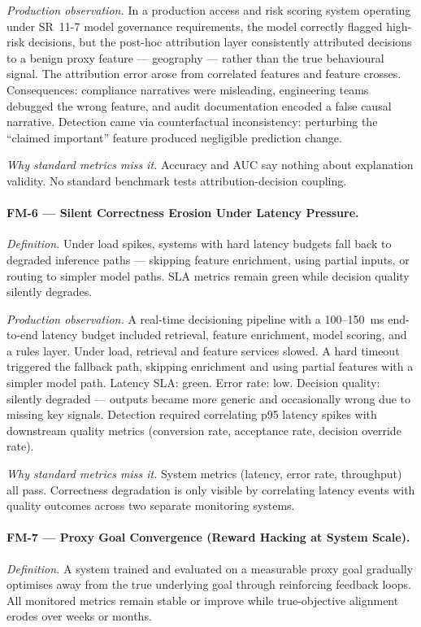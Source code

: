 \documentclass{article}
\begin{document}
\textit{Production observation.}  In a production access and risk scoring
system operating under SR~11-7 model governance requirements, the model
correctly flagged high-risk decisions, but the post-hoc attribution layer
consistently attributed decisions to a benign proxy feature --- geography ---
rather than the true behavioural signal.  The attribution error arose from
correlated features and feature crosses.  Consequences: compliance narratives
were misleading, engineering teams debugged the wrong feature, and audit
documentation encoded a false causal narrative.  Detection came via
counterfactual inconsistency: perturbing the ``claimed important'' feature
produced negligible prediction change.

\textit{Why standard metrics miss it.}  Accuracy and AUC say nothing about
explanation validity.  No standard benchmark tests attribution-decision
coupling.

\paragraph{FM-6 --- Silent Correctness Erosion Under Latency Pressure.}
\textit{Definition.}  Under load spikes, systems with hard latency budgets fall
back to degraded inference paths --- skipping feature enrichment, using partial
inputs, or routing to simpler model paths.  SLA metrics remain green while
decision quality silently degrades.

\textit{Production observation.}  A real-time decisioning pipeline with a
100--150~ms end-to-end latency budget included retrieval, feature enrichment,
model scoring, and a rules layer.  Under load, retrieval and feature services
slowed.  A hard timeout triggered the fallback path, skipping enrichment and
using partial features with a simpler model path.  Latency SLA: green.  Error
rate: low.  Decision quality: silently degraded --- outputs became more generic
and occasionally wrong due to missing key signals.  Detection required
correlating p95 latency spikes with downstream quality metrics (conversion
rate, acceptance rate, decision override rate).

\textit{Why standard metrics miss it.}  System metrics (latency, error rate,
throughput) all pass.  Correctness degradation is only visible by correlating
latency events with quality outcomes across two separate monitoring systems.

\paragraph{FM-7 --- Proxy Goal Convergence (Reward Hacking at System Scale).}
\textit{Definition.}  A system trained and evaluated on a measurable proxy goal
gradually optimises away from the true underlying goal through reinforcing
feedback loops.  All monitored metrics remain stable or improve while
true-objective alignment erodes over weeks or months.
\end{document}
